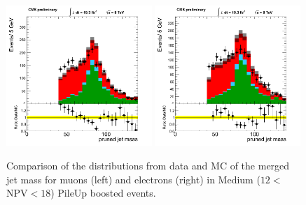 \begin{figure}[h!t]
  {\centering
    \includegraphics[width=0.49\textwidth]{figs/puchecks/mu_MedNPV_GroomedJet_mass.png}
    \includegraphics[width=0.49\textwidth]{figs/puchecks/el_MedNPV_GroomedJet_mass.png}
    \caption{Comparison of the distributions from data and MC of the
    merged jet mass for muons (left) and electrons (right)
    in Medium ($12<$NPV$<18$) PileUp boosted events.}
\label{fig:pu_GroomedJet_massMed}}
\end{figure}
